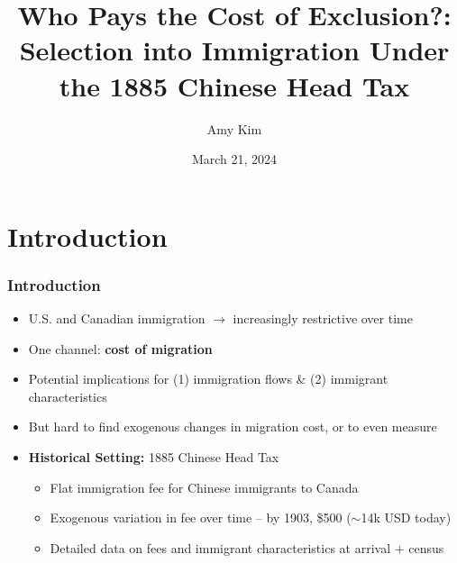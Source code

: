 \documentclass[xcolor=dvipsnames, compress, 12pt, aspectratio=169, handout]{beamer}
\title{Who Pays the Cost of Exclusion?: Selection into Immigration Under the 1885 Chinese Head Tax}
\author{Amy Kim}
\date{March 21, 2024}
\begin{document}
\begin{frame}[plain]
    \titlepage
\end{frame}

\section{Introduction}
\begin{frame}
    \frametitle{Introduction}
    \begin{itemize}
        \item U.S. and Canadian immigration $\rightarrow$ increasingly restrictive over time
        \vspace{2mm}
        \item One channel: \textbf{cost of migration} 
        \vspace{2mm}
        \item Potential implications for (1) immigration flows \& (2) immigrant characteristics
        \vspace{2mm}
        \item But hard to find exogenous changes in migration cost, or to even measure
        \vspace{2mm}
        \item \textbf{Historical Setting:} 1885 Chinese Head Tax
        \begin{itemize}
            \vspace{1mm}
            \item Flat immigration fee for Chinese immigrants to Canada
            \vspace{1mm}
            \item Exogenous variation in fee over time -- by 1903, \$500 ($\sim$14k USD today)
            \vspace{1mm}
            \item Detailed data on fees and immigrant characteristics at arrival $+$ census 
        \end{itemize}
    \end{itemize}
\end{frame}
\end{document}
